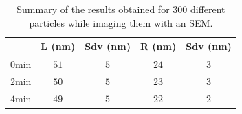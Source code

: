 \documentclass[a4paper,oneside,onecolumn]{article}
\begin{document}
\begin{table}[htp]
\begin{tabular*}{0.48\textwidth}{c c c c c}
 $\,$ & L (nm) & Sdv (nm) & R (nm) & Sdv (nm) \\\hline
 $0\textrm{min}$ & $51$ & $5$ & $24$ & $3$ \\ 
 $2\textrm{min}$ & $50$ & $5$ & $23$ & $3$ \\
 $4\textrm{min}$ & $49$ & $5$ & $22$ & $2$ \\
\end{tabular*}
\label{tab:SEM_results}
\caption{Summary of the results obtained for 300 different particles while
imaging them with an SEM.}
\end{table}
\end{document}
